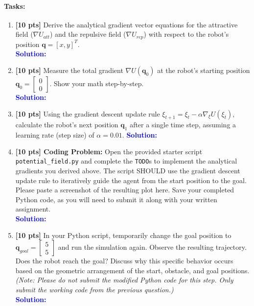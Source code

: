 \documentclass[11pt,letterpaper]{article}
\newcommand{\solutionspace}{%
  \vspace{0.2em}%
  \noindent\textbf{\textcolor{blue}{Solution:}}\par
}
\begin{document}
\paragraph{Tasks:}
\begin{enumerate}
    \item \textbf{[10 pts]} Derive the analytical gradient vector equations for the attractive field ($\nabla U_{att}$) and the repulsive field ($\nabla U_{rep}$) with respect to the robot's position $\mathbf{q} = [x, y]^T$. \\
    \solutionspace
        \vspace{0.3cm}
    \item \textbf{[10 pts]} Measure the total gradient $\nabla U(\mathbf{q}_0)$ at the robot's starting position $\mathbf{q}_0 = \begin{bmatrix} 0 \\ 0 \end{bmatrix}$. Show your math step-by-step. \\
    \solutionspace
        \vspace{0.3cm}
    \item \textbf{[10 pts]} Using the gradient descent update rule $\xi_{t+1} = \xi_t - \alpha \nabla_{\xi} U(\xi_t)$, calculate the robot's next position $\mathbf{q}_1$ after a single time step, assuming a learning rate (step size) of $\alpha = 0.01$.
    \solutionspace
        \vspace{0.3cm}
    \item \textbf{[10 pts] Coding Problem:} Open the provided starter script \texttt{potential\_field.py} and complete the \texttt{TODO}s to implement the analytical gradients you derived above. The script SHOULD use the gradient descent update rule to iteratively guide the agent from the start position to the goal. Please paste a screenshot of the resulting plot here. Save your completed Python code, as you will need to submit it along with your written assignment. \\
    \solutionspace
        \vspace{0.3cm}

    \item \textbf{[10 pts]} In your Python script, temporarily change the goal position to $\mathbf{q}_{goal} = \begin{bmatrix} 5 \\ 5 \end{bmatrix}$ and run the simulation again. Observe the resulting trajectory. Does the robot reach the goal? Discuss why this specific behavior occurs based on the geometric arrangement of the start, obstacle, and goal positions. \textit{(Note: Please do not submit the modified Python code for this step. Only submit the working code from the previous question.)} \\
    \solutionspace
        \vspace{0.3cm}
\end{enumerate}
\end{document}
